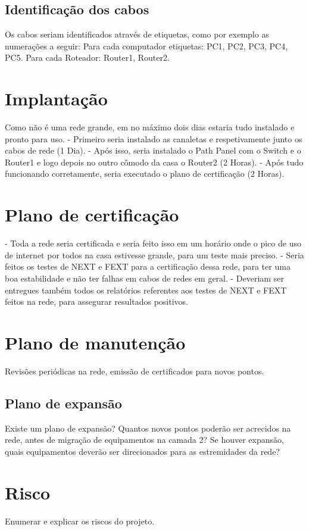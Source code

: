\documentclass[	DIV=calc,%
							paper=a4,%
							fontsize=12pt,%
							onecolumn]{scrartcl}	 					%
\begin{document}
\subsection{Identificação dos cabos}
	Os cabos seriam identificados através de etiquetas, como por exemplo as numerações a seguir:
	Para cada computador etiquetas: PC1, PC2, PC3, PC4, PC5.
	Para cada Roteador: Router1, Router2.
	
\section{Implantação}
	Como não é uma rede grande, em no máximo dois dias estaria tudo instalado e pronto para uso.
- Primeiro seria instalado as canaletas e respetivamente junto os cabos de rede (1 Dia).
- Após isso, seria instalado o Path Panel com o Switch e o Router1 e logo depois no outro cômodo da casa o Router2 (2 Horas).
- Após tudo funcionando corretamente, seria executado o plano de certificação (2 Horas).


\section{Plano de certificação}
- Toda a rede seria certificada e seria feito isso em um horário onde o pico de uso de internet por todos na casa estivesse grande, para um teste mais preciso.
- Seria feitos os testes de NEXT e FEXT para a certificação dessa rede, para ter uma boa estabilidade e não ter falhas em cabos de redes em geral.
- Deveriam ser entregues também todos os relatórios referentes aos testes de NEXT e FEXT feitos na rede, para assegurar resultados positivos.


\section{Plano de manutenção}

Revisões periódicas na rede, emissão de certificados para novos pontos.

\subsection{Plano de expansão}
Existe um plano de expansão? Quantos novos pontos poderão ser acrecidos na rede, antes de migração de equipamentos na camada 2? Se houver expansão, quais equipamentos deverão ser direcionados para as estremidades da rede? 

\section{Risco}
Enumerar e explicar os riscos do projeto.
\end{document}
